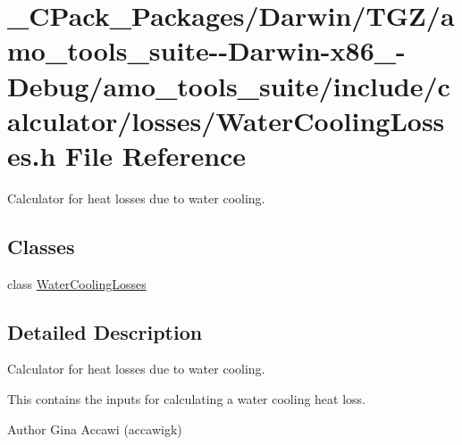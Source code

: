 \hypertarget{___c_pack___packages_2_darwin_2_t_g_z_2amo__tools__suite--_darwin-x86__64-_debug_2amo__tools__su98945856ab6bab047f049ab392a7829a}{}\section{\+\_\+\+C\+Pack\+\_\+\+Packages/\+Darwin/\+T\+G\+Z/amo\+\_\+tools\+\_\+suite-\/-\/\+Darwin-\/x86\+\_-\/\+Debug/amo\+\_\+tools\+\_\+suite/include/calculator/losses/\+Water\+Cooling\+Losses.h File Reference}
\label{___c_pack___packages_2_darwin_2_t_g_z_2amo__tools__suite--_darwin-x86__64-_debug_2amo__tools__su98945856ab6bab047f049ab392a7829a}


Calculator for heat losses due to water cooling.  


\subsection*{Classes}
\begin{DoxyCompactItemize}
\item 
class \hyperlink{class_water_cooling_losses}{Water\+Cooling\+Losses}
\end{DoxyCompactItemize}


\subsection{Detailed Description}
Calculator for heat losses due to water cooling. 

This contains the inputs for calculating a water cooling heat loss.

\begin{DoxyAuthor}{Author}
Gina Accawi (accawigk) 
\end{DoxyAuthor}
